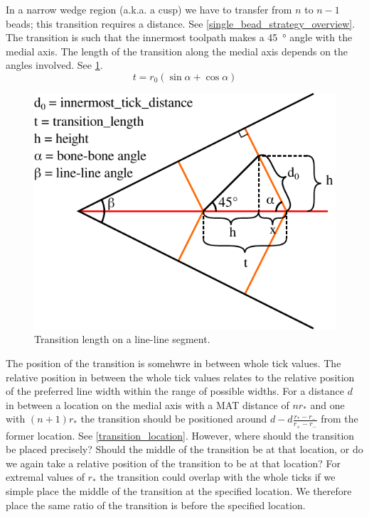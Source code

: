 In a narrow wedge region (a.k.a. a cusp) we have to transfer from $n$ to $n-1$ beads; this transition requires a distance.
See \cref{single_bead_strategy_overview}.
The transition is such that the innermost toolpath makes a \SI{45}{\degree} angle with the medial axis.
The length of the transition along the medial axis depends on the angles involved.
See \cref{transition_length}.
\begin{equation}
t = r_0 (\sin \alpha + \cos \alpha)
\end{equation}

\begin{figure}[H]
\centering
\includegraphics[width=.75\columnwidth]{sources/method/transition_length_v2.pdf}
\caption{Transition length on a line-line segment.}
\label{transition_length}
\end{figure}

The position of the transition is somehwre in between whole tick values.
The relative position in between the whole tick values relates to the relative position of the preferred line width within the range of possible widths.
For a distance $d$ in between a location on the medial axis with a MAT distance of $nr_*$ and one with $(n+1)r_*$ the transition should be positioned around $d - d\frac{r_* - r_-}{r_+ - r_-}$ from the former location.
See \cref{transition_location}.
However, where should the transition be placed precisely? Should the middle of the transition be at that location, or do we again take a relative position of the transition to be at that location?
For extremal values of $r_*$ the transition could overlap with the whole ticks if we simple place the middle of the transition at the specified location.
We therefore place the same ratio of the transition is before the specified location.

